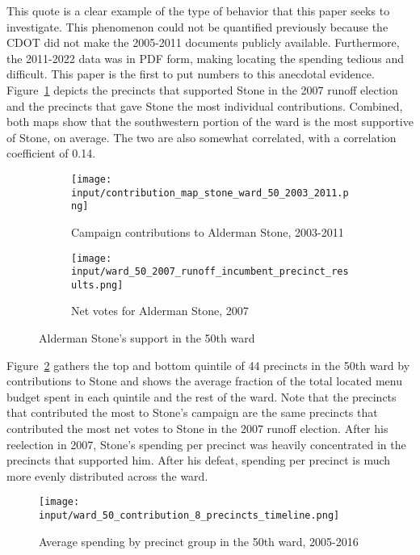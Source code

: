 This quote is a clear example of the type of behavior that this paper seeks to investigate.
This phenomenon could not be quantified previously because the CDOT did not make the 2005-2011 documents publicly available. 
Furthermore, the 2011-2022 data was in PDF form, making locating the spending tedious and difficult.
This paper is the first to put numbers to this anecdotal evidence.
Figure~\ref{fig:stone_support_maps} depicts the precincts that supported Stone in the 2007 runoff election and the precincts that gave Stone the most individual contributions.
Combined, both maps show that the southwestern portion of the ward is the most supportive of Stone, on average.
The two are also somewhat correlated, with a correlation coefficient of 0.14.
\begin{figure}[H]
    \centering
    \begin{subfigure}[b]{0.45\textwidth} %
    \texttt{[image: input/contribution\_map\_stone\_ward\_50\_2003\_2011.png]}
    \caption{Campaign contributions to Alderman Stone, 2003-2011}
    \end{subfigure}
    \hfill %
    \begin{subfigure}[b]{0.45\textwidth}
    \texttt{[image: input/ward\_50\_2007\_runoff\_incumbent\_precinct\_results.png]}
    \caption{Net votes for Alderman Stone, 2007}
    \end{subfigure}
    \caption{Alderman Stone's support in the 50th ward}
    \label{fig:stone_support_maps}
\end{figure}

Figure~\ref{fig:stone_spending_timeline} gathers the top and bottom quintile of 44 precincts in the 50th ward by contributions to Stone and shows the average fraction of the total located menu budget spent in each quintile and the rest of the ward.
Note that the precincts that contributed the most to Stone's campaign are the same precincts that contributed the most net votes to Stone in the 2007 runoff election.
After his reelection in 2007, Stone's spending per precinct was heavily concentrated in the precincts that supported him.
After his defeat, spending per precinct is much more evenly distributed across the ward.

\begin{figure}[H]
    \centering
    \texttt{[image: input/ward\_50\_contribution\_8\_precincts\_timeline.png]}
    \caption{Average spending by precinct group in the 50th ward, 2005-2016}
    \label{fig:stone_spending_timeline}
\end{figure}

